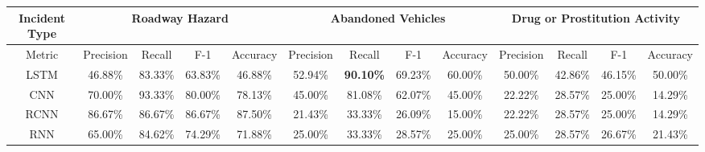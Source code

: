 \begin{table}[]
\begin{tabular}{||c|cccc|cccc|cccc||}
Incident Type & \multicolumn{4}{c|}{Roadway Hazard}                                                                                                        & \multicolumn{4}{c|}{Abandoned Vehicles}                                                                                                    & \multicolumn{4}{c||}{Drug or Prostitution Activity}                                                                                         \\ \hline\hline
Metric        & \multicolumn{1}{c|}{Precision}         & \multicolumn{1}{c|}{Recall}            & \multicolumn{1}{c|}{F-1}              & Accuracy         & \multicolumn{1}{c|}{Precision}         & \multicolumn{1}{c|}{Recall}            & \multicolumn{1}{c|}{F-1}              & Accuracy         & \multicolumn{1}{c|}{Precision}         & \multicolumn{1}{c|}{Recall}            & \multicolumn{1}{c|}{F-1}              & Accuracy         \\ \hline
LSTM          & \multicolumn{1}{c|}{46.88\%}           & \multicolumn{1}{c|}{83.33\%} & \multicolumn{1}{c|}{63.83\%}          & 46.88\%          & \multicolumn{1}{c|}{52.94\%}           & \multicolumn{1}{c|}{\textbf{90.10\%}} & \multicolumn{1}{c|}{69.23\%}          & 60.00\%          & \multicolumn{1}{c|}{50.00\%}           & \multicolumn{1}{c|}{42.86\%}           & \multicolumn{1}{c|}{46.15\%}          & 50.00\%          \\ \hline
CNN           & \multicolumn{1}{c|}{70.00\%}           & \multicolumn{1}{c|}{93.33\%}           & \multicolumn{1}{c|}{80.00\%}          & 78.13\%          & \multicolumn{1}{c|}{45.00\%}           & \multicolumn{1}{c|}{81.08\%} & \multicolumn{1}{c|}{62.07\%}          & 45.00\%          & \multicolumn{1}{c|}{22.22\%}           & \multicolumn{1}{c|}{28.57\%}           & \multicolumn{1}{c|}{25.00\%}          & 14.29\%          \\ \hline
RCNN          & \multicolumn{1}{c|}{86.67\%}           & \multicolumn{1}{c|}{86.67\%}           & \multicolumn{1}{c|}{86.67\%}          & 87.50\%          & \multicolumn{1}{c|}{21.43\%}           & \multicolumn{1}{c|}{33.33\%}           & \multicolumn{1}{c|}{26.09\%}          & 15.00\%          & \multicolumn{1}{c|}{22.22\%}           & \multicolumn{1}{c|}{28.57\%}           & \multicolumn{1}{c|}{25.00\%}          & 14.29\%          \\ \hline
RNN           & \multicolumn{1}{c|}{65.00\%}           & \multicolumn{1}{c|}{84.62\%}           & \multicolumn{1}{c|}{74.29\%}          & 71.88\%          & \multicolumn{1}{c|}{25.00\%}           & \multicolumn{1}{c|}{33.33\%}           & \multicolumn{1}{c|}{28.57\%}          & 25.00\%          & \multicolumn{1}{c|}{25.00\%}           & \multicolumn{1}{c|}{28.57\%}           & \multicolumn{1}{c|}{26.67\%}          & 21.43\%          \\ \hline

\end{tabular}
\end{table}
